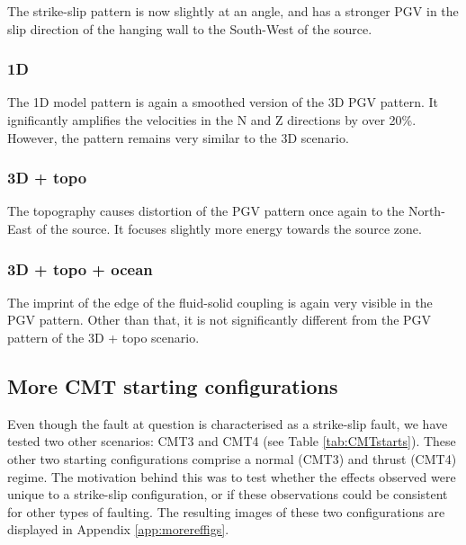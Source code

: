 \documentclass[../Text/00main.tex]{subfiles}
\begin{document}

The strike-slip pattern is now slightly at an angle, and has a stronger PGV in the slip direction of the hanging wall to the South-West of the source. 

\subsubsection{1D}

The 1D model pattern is again a smoothed version of the 3D PGV pattern. It ignificantly amplifies the velocities in the N and Z directions by over 20\%. However, the pattern remains very similar to the 3D scenario. 

\subsubsection{3D + topo}

The topography causes  distortion of the PGV pattern once again to the North-East of the source. It focuses slightly more energy towards the source zone. 

\subsubsection{3D + topo + ocean}

The imprint of the edge of the fluid-solid coupling is again very visible in the PGV pattern. Other than that, it is not significantly different from the PGV pattern of the 3D + topo scenario.

\subsection{More CMT starting configurations}

Even though the fault at question is characterised as a strike-slip fault, we have tested two other scenarios: CMT3 and CMT4 (see Table \ref{tab:CMTstarts}). These other two starting configurations comprise a normal (CMT3) and thrust (CMT4) regime. The motivation behind this was to test whether the effects observed were unique to a strike-slip configuration, or if these observations could be consistent for other types of faulting. The resulting images of these two configurations are displayed in Appendix \ref{app:morereffigs}.

\end{document}
